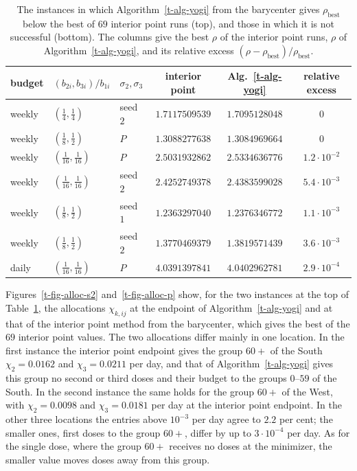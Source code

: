 \documentclass[11pt]{article}
\theoremstyle{plain}
\theoremstyle{remark}
\numberwithin{equation}{section}
\begin{document}
\begin{table}[ht]
\centering
\small
\begin{tabular}{lllccc}
\hline
budget & $(b_{2i},b_{3i})/b_{1i}$ & $\sigma_2,\sigma_3$ & interior point &
Alg.~\ref{t-alg-yogi} & relative excess\\
\hline
weekly & $(\tfrac14,\tfrac14)$       & seed $2$ & $1.7117509539$ & $1.7095128048$ & $0$\\
weekly & $(\tfrac18,\tfrac12)$       & $P$      & $1.3088277638$ & $1.3084969664$ & $0$\\
\hline
weekly & $(\tfrac1{16},\tfrac1{16})$ & $P$      & $2.5031932862$ & $2.5334636776$ & $1.2\cdot 10^{-2}$\\
weekly & $(\tfrac1{16},\tfrac1{16})$ & seed $2$ & $2.4252749378$ & $2.4383599028$ & $5.4\cdot 10^{-3}$\\
weekly & $(\tfrac18,\tfrac12)$       & seed $1$ & $1.2363297040$ & $1.2376346772$ & $1.1\cdot 10^{-3}$\\
weekly & $(\tfrac18,\tfrac12)$       & seed $2$ & $1.3770469379$ & $1.3819571439$ & $3.6\cdot 10^{-3}$\\
daily  & $(\tfrac1{16},\tfrac1{16})$ & $P$      & $4.0391397841$ & $4.0402962781$ & $2.9\cdot 10^{-4}$\\
\hline
\end{tabular}
\caption{The instances in which Algorithm~\ref{t-alg-yogi} from the barycenter
gives $\rho_{\mathrm{best}}$ below the best of $69$ interior point runs (top),
and those in which it is not successful (bottom). The columns give the best
$\rho$ of the interior point runs, $\rho$ of Algorithm~\ref{t-alg-yogi}, and
its relative excess $(\rho-\rho_{\mathrm{best}})/\rho_{\mathrm{best}}$.}\label{t-tab-yogi-inst}
\end{table}

Figures~\ref{t-fig-alloc-s2} and~\ref{t-fig-alloc-p} show, for the two
instances at the top of Table~\ref{t-tab-yogi-inst}, the allocations
$\chi_{k,ij}$ at the endpoint of Algorithm~\ref{t-alg-yogi} and at that of the
interior point method from the barycenter, which gives the best of the $69$
interior point values. The two allocations differ mainly in one location. In
the first instance the interior point endpoint gives the group $60+$ of the
South $\chi_{2}=0.0162$ and $\chi_{3}=0.0211$ per day, and that of
Algorithm~\ref{t-alg-yogi} gives this group no second or third doses and their
budget to the groups $0$--$59$ of the South. In the second instance the same
holds for the group $60+$ of the West, with $\chi_{2}=0.0098$ and
$\chi_{3}=0.0181$ per day at the interior point endpoint. In the other three
locations the entries above $10^{-3}$ per day agree to $2.2$ per cent; the
smaller ones, first doses to the group $60+$, differ by up to
$3\cdot 10^{-4}$ per day. As for the single dose, where the group $60+$
receives no doses at the minimizer, the smaller value moves doses away from
this group.
\end{document}
